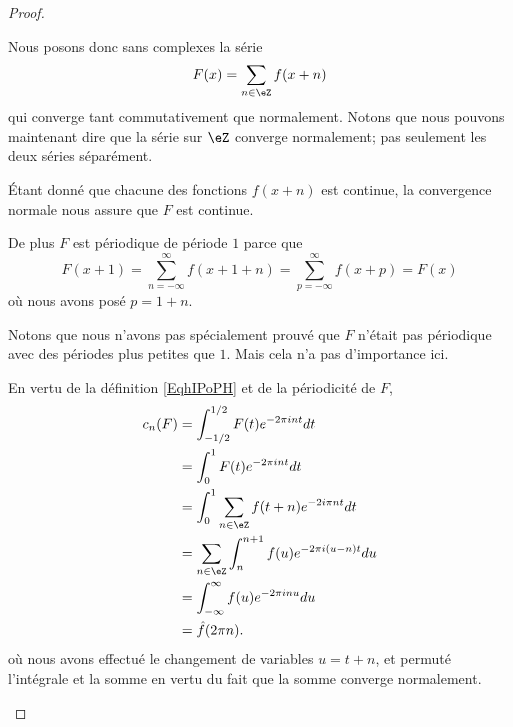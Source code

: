 \begin{proof}
\begin{subproof}

		Nous posons donc sans complexes la série
		\begin{equation}
			F(x)=\sum_{n\in \eZ}f(x+n)
		\end{equation}
		qui converge tant commutativement que normalement. Notons que nous pouvons maintenant dire que la série sur \( \eZ\) converge normalement; pas seulement les deux séries séparément.

		Étant donné que chacune des fonctions \( f(x+n)\) est continue, la convergence normale nous assure que \( F\) est continue.

		De plus \( F\) est périodique de période \( 1\) parce que
		\begin{equation}
			F(x+1)=\sum_{n=-\infty}^{\infty}f(x+1+n)=\sum_{p=-\infty}^{\infty}f(x+p)=F(x)
		\end{equation}
		où nous avons posé \( p=1+n\).

		Notons que nous n'avons pas spécialement prouvé que \( F\) n'était pas périodique avec des périodes plus petites que \( 1\). Mais cela n'a pas d'importance ici.


		En vertu de la définition \eqref{EqhIPoPH} et de la périodicité de \( F\),
		\begin{subequations}
			\begin{align}
				c_n(F) & =\int_{-1/2}^{1/2}F(t) e^{-2\pi int}dt                \\
				       & =\int_0^1F(t) e^{-2\pi int}dt                         \\
				       & =\int_0^1\sum_{n\in \eZ}f(t+n) e^{-2 i\pi nt}dt       \\
				       & =\sum_{n\in \eZ}\int_n^{n+1}f(u) e^{-2\pi i (u-n)t}du \\
				       & =\int_{-\infty}^{\infty}f(u) e^{-2\pi inu}du          \\
				       & =\hat f(2\pi n).
			\end{align}
		\end{subequations}
		où nous avons effectué le changement de variables \( u=t+n\), et permuté l'intégrale et la somme en vertu du fait que la somme converge normalement.

		\spitem[Conclusion]


\end{subproof}
\end{proof}
